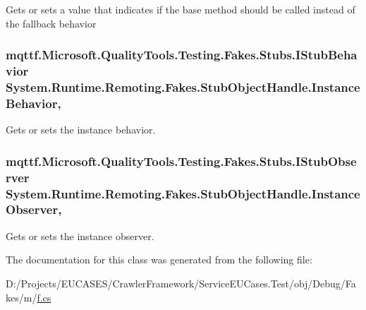 Gets or sets a value that indicates if the base method should be called instead of the fallback behavior

\hypertarget{class_system_1_1_runtime_1_1_remoting_1_1_fakes_1_1_stub_object_handle_a80ce7e2e7947e66f58352ed0a6448a5f}{
\subsubsection[{Instance\-Behavior}]{\setlength{\rightskip}{0pt plus 5cm}mqttf.\-Microsoft.\-Quality\-Tools.\-Testing.\-Fakes.\-Stubs.\-I\-Stub\-Behavior System.\-Runtime.\-Remoting.\-Fakes.\-Stub\-Object\-Handle.\-Instance\-Behavior\hspace{0.3cm}{\ttfamily [get]}, {\ttfamily [set]}}}\label{class_system_1_1_runtime_1_1_remoting_1_1_fakes_1_1_stub_object_handle_a80ce7e2e7947e66f58352ed0a6448a5f}


Gets or sets the instance behavior.

\hypertarget{class_system_1_1_runtime_1_1_remoting_1_1_fakes_1_1_stub_object_handle_a5643e2d7bbb78ff83cdf637289c3751d}{
\subsubsection[{Instance\-Observer}]{\setlength{\rightskip}{0pt plus 5cm}mqttf.\-Microsoft.\-Quality\-Tools.\-Testing.\-Fakes.\-Stubs.\-I\-Stub\-Observer System.\-Runtime.\-Remoting.\-Fakes.\-Stub\-Object\-Handle.\-Instance\-Observer\hspace{0.3cm}{\ttfamily [get]}, {\ttfamily [set]}}}\label{class_system_1_1_runtime_1_1_remoting_1_1_fakes_1_1_stub_object_handle_a5643e2d7bbb78ff83cdf637289c3751d}


Gets or sets the instance observer.



The documentation for this class was generated from the following file\-:\begin{DoxyCompactItemize}
\item 
D\-:/\-Projects/\-E\-U\-C\-A\-S\-E\-S/\-Crawler\-Framework/\-Service\-E\-U\-Cases.\-Test/obj/\-Debug/\-Fakes/m/\hyperlink{m_2f_8cs}{f.\-cs}\end{DoxyCompactItemize}
